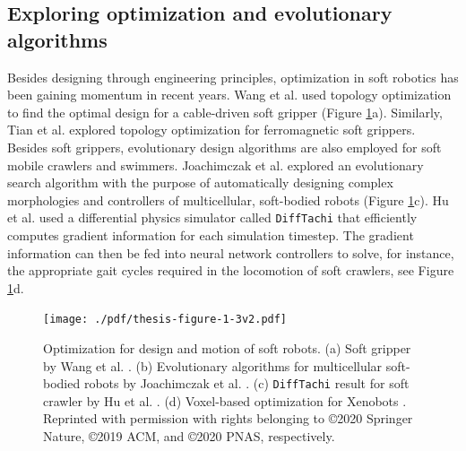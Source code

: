 \subsection{Exploring optimization and evolutionary algorithms}
Besides designing through engineering principles, optimization in soft robotics has been gaining momentum in recent years. Wang et al. \cite{Wang2020Nov} used topology optimization to find the optimal design for a cable-driven soft gripper (Figure \ref{fig:C0:optztypes}a). Similarly, Tian et al. \cite{Tian2020May} explored topology optimization for ferromagnetic soft grippers. Besides soft grippers, evolutionary design algorithms are also employed for soft mobile crawlers and swimmers. Joachimczak et al. \cite{Joachimczak2014Jul,Joachimczak2015} explored an evolutionary search algorithm with the purpose of automatically designing complex morphologies and controllers of multicellular, soft-bodied robots (Figure \ref{fig:C0:optztypes}c). Hu et al. \cite{Hu2019taichi} used a differential physics simulator called \texttt{DiffTachi} that efficiently computes gradient information for each simulation timestep. The gradient information can then be fed into neural network controllers to solve, for instance, the appropriate gait cycles required in the locomotion of soft crawlers, see Figure \ref{fig:C0:optztypes}d.

\begin{figure}[!t]
  \vspace{-2mm}
  \texttt{[image: ./pdf/thesis-figure-1-3v2.pdf]}
  \vspace{-6mm}
  \caption{\small Optimization for design and motion of soft robots. (a) Soft gripper by Wang et al. \cite{Wang2020Nov}. (b) Evolutionary algorithms for multicellular soft-bodied robots by Joachimczak et al. \cite{Joachimczak2014Jul,Joachimczak2015}. (c) \texttt{DiffTachi} result for soft crawler by Hu et al. \cite{Hu2019taichi}. (d) Voxel-based optimization for Xenobots \cite{Kriegman2020}. Reprinted with permission with rights belonging to \copyright2020 Springer Nature, \copyright 2019 ACM, and \copyright 2020 PNAS, respectively. }
  \label{fig:C0:optztypes}
  \vspace{-4mm}
\end{figure}

\vspace{-2mm}

